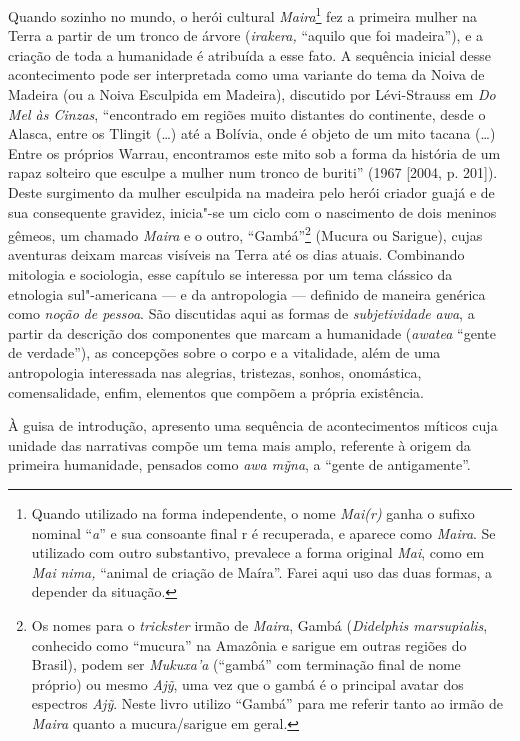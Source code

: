 Quando sozinho no mundo, o herói cultural \emph{Maira}\footnote{Quando
  utilizado na forma independente, o nome \emph{Mai(r)} ganha o sufixo
  nominal ``\emph{a}'' e sua consoante final r é recuperada, e aparece
  como \emph{Maira}. Se utilizado com outro substantivo, prevalece a
  forma original \emph{Mai}, como em \emph{Mai} \emph{nima,} ``animal de
      criação de Maíra''. Farei aqui uso das duas formas, a depender da
  situação.} fez a primeira mulher na Terra a partir de um tronco de
árvore (\emph{irakera,} ``aquilo que foi madeira''), e a criação de toda a
humanidade é atribuída a esse fato. A sequência inicial desse
acontecimento pode ser interpretada como uma variante do tema da Noiva
de Madeira (ou a Noiva Esculpida em Madeira), discutido por Lévi-Strauss
em \emph{Do Mel às Cinzas}, ``encontrado em regiões muito distantes do
continente, desde o Alasca, entre os Tlingit (\ldots{}) até a Bolívia, onde é
objeto de um mito tacana (\ldots{}) Entre os próprios Warrau, encontramos
este mito sob a forma da história de um rapaz solteiro que esculpe a
mulher num tronco de buriti'' (1967 {[}2004, p. 201{]}). Deste surgimento
da mulher esculpida na madeira pelo herói criador guajá e de sua
consequente gravidez, inicia"-se um ciclo com o nascimento de dois
meninos gêmeos, um chamado \emph{Maira} e o outro, ``Gambá''\footnote{Os
  nomes para o \emph{trickster} irmão de \emph{Maira}, Gambá
  (\emph{Didelphis marsupialis}, conhecido como ``mucura'' na Amazônia e
  sarigue em outras regiões do Brasil), podem ser \emph{Mukuxa'a}
  (``gambá'' com terminação final de nome próprio) ou mesmo \emph{Ajỹ},
  uma vez que o gambá é o principal avatar dos espectros \emph{Ajỹ}.
  Neste livro utilizo ``Gambá'' para me referir tanto ao irmão de
  \emph{Maira} quanto a mucura/sarigue em geral.} (Mucura ou Sarigue),
cujas aventuras deixam marcas visíveis na Terra até os dias atuais.
Combinando mitologia e sociologia, esse capítulo se interessa por um
tema clássico da etnologia sul"-americana --- e da antropologia --- definido
de maneira genérica como \emph{noção} \emph{de pessoa}. São discutidas
aqui as formas de \emph{subjetividade} \emph{awa}, a partir da descrição
dos componentes que marcam a humanidade (\emph{awatea} ``gente de
verdade''), as concepções sobre o corpo e a vitalidade, além de uma
antropologia interessada nas alegrias, tristezas, sonhos, onomástica,
comensalidade, enfim, elementos que compõem a própria existência.

À guisa de introdução, apresento uma sequência de acontecimentos míticos
cuja unidade das narrativas compõe um tema mais amplo, referente à
origem da primeira humanidade, pensados como \emph{awa mỹna}, a ``gente
de antigamente''.

